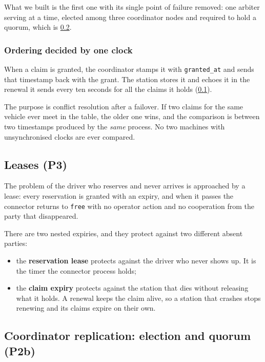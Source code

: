 What we built is the first one with its single point of failure removed: one
arbiter serving at a time, elected among three coordinator nodes and required to
hold a quorum, which is \cref{sec:p2b}.

\subsubsection{Ordering decided by one clock}

When a claim is granted, the coordinator stamps it with \texttt{granted\_at} and
sends that timestamp back with the grant. The station stores it and echoes it in
the renewal it sends every ten seconds for all the claims it holds
(\cref{sec:p3}).

The purpose is conflict resolution after a failover. If two claims for the same
vehicle ever meet in the table, the older one wins, and the comparison is between
two timestamps produced by the \emph{same} process. No two machines with
unsynchronised clocks are ever compared.

\subsection{Leases (P3)}
\label{sec:p3}

The problem of the driver who reserves and never arrives is approached by a lease: every reservation is granted with an expiry, and
when it passes the connector returns to \texttt{free} with no operator action and
no cooperation from the party that disappeared.

There are two nested expiries, and they protect against two different absent
parties:

\begin{itemize}
  \item the \textbf{reservation lease} protects against the driver who never
        shows up. It is the timer the connector process holds;
  \item the \textbf{claim expiry} protects against the station that dies without
        releasing what it holds. A renewal keeps the claim alive, so a station
        that crashes stops renewing and its claims expire on their own.
\end{itemize}


\subsection{Coordinator replication: election and quorum (P2b)}
\label{sec:p2b}

